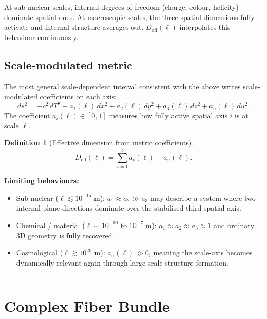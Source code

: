 \documentclass[11pt, a4paper, oneside]{article}
\theoremstyle{definition}
\newtheorem{definition}{Definition}[section]
\theoremstyle{plain}
\theoremstyle{remark}
\begin{document}
At sub-nuclear scales, internal degrees of freedom (charge, colour,
helicity) dominate spatial ones.
At macroscopic scales, the three spatial dimensions fully activate and
internal structure averages out.
$D_\mathrm{eff}(\ell)$ interpolates this behaviour continuously.

\subsection{Scale-modulated metric}

The most general scale-dependent interval consistent with the above
writes scale-modulated coefficients on each axis:
\begin{equation}
  ds^2 = -c^2\,dT^2
         + a_1(\ell)\,dx^2
         + a_2(\ell)\,dy^2
         + a_3(\ell)\,dz^2
         + a_u(\ell)\,du^2.
  \label{eq:scale_metric}
\end{equation}
The coefficient $a_i(\ell) \in [0,1]$ measures how fully active spatial
axis $i$ is at scale $\ell$.

\begin{definition}[Effective dimension from metric coefficients]
  \begin{equation}
    D_\mathrm{eff}(\ell) = \sum_{i=1}^{3} a_i(\ell) + a_u(\ell).
    \label{eq:Deff_metric}
  \end{equation}
\end{definition}

\noindent\textbf{Limiting behaviours:}
\begin{itemize}
  \item Sub-nuclear ($\ell \lesssim 10^{-15}$ m): $a_1 \approx a_2 \gg a_3$
    may describe a system where two internal-plane directions dominate
    over the stabilised third spatial axis.
  \item Chemical / material ($\ell \sim 10^{-10}$ to $10^{-7}$ m):
    $a_1 \approx a_2 \approx a_3 \approx 1$ and ordinary 3D geometry is
    fully recovered.
  \item Cosmological ($\ell \gtrsim 10^{20}$ m): $a_u(\ell) \gg 0$,
    meaning the scale-axis becomes dynamically relevant again through
    large-scale structure formation.
\end{itemize}

\noindent\rule{\linewidth}{0.4pt}

\section{Complex Fiber Bundle}
\label{sec:fibre}
\end{document}
